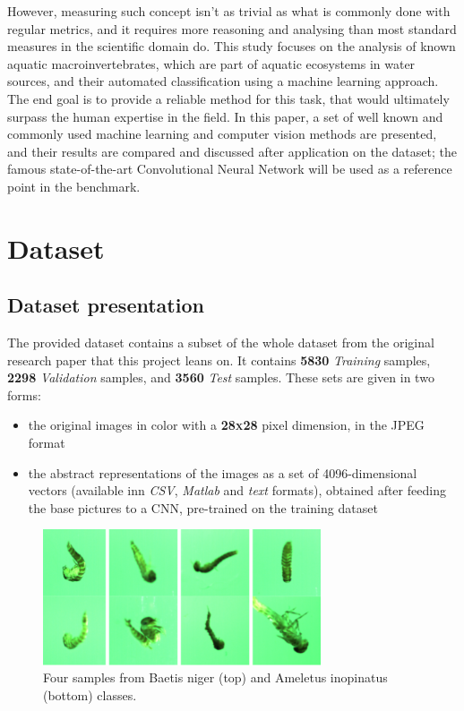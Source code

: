 \documentclass[conference]{IEEEtran}
\begin{document}
However, measuring such concept isn't as trivial as what is commonly done with regular metrics, and it requires more reasoning and analysing than most standard measures in the scientific domain do. This study focuses on the analysis of known aquatic macroinvertebrates, which are part of aquatic ecosystems in water sources, and their automated classification using a machine learning approach. The end goal is to provide a reliable method for this task, that would ultimately surpass the human expertise in the field. In this paper, a set of well known and commonly used machine learning and computer vision methods are presented, and their results are compared and discussed after application on the dataset; the famous state-of-the-art Convolutional Neural Network will be used as a reference point in the benchmark.

\section{Dataset}

\subsection{Dataset presentation}
The provided dataset contains a subset of the whole dataset from the original research paper that this project leans on. It contains \textbf{5830} \emph{Training} samples, \textbf{2298} \emph{Validation} samples, and \textbf{3560} \emph{Test} samples. These sets are given in two forms:
\begin{itemize}
    \item the original images in color with a \textbf{\textsc{28x28}} pixel dimension, in the JPEG format
    \item the abstract representations of the images as a set of 4096-dimensional vectors (available inn \emph{CSV}, \emph{Matlab} and \emph{text} formats), obtained after feeding the base pictures to a CNN, pre-trained on the training dataset
\end{itemize}

\begin{figure}[h]
    \centering
        \includegraphics[height=4cm]{sample_macrobitches}
    \caption{Four samples from Baetis niger (top) and Ameletus inopinatus (bottom) classes.}
\end{figure}
\end{document}

